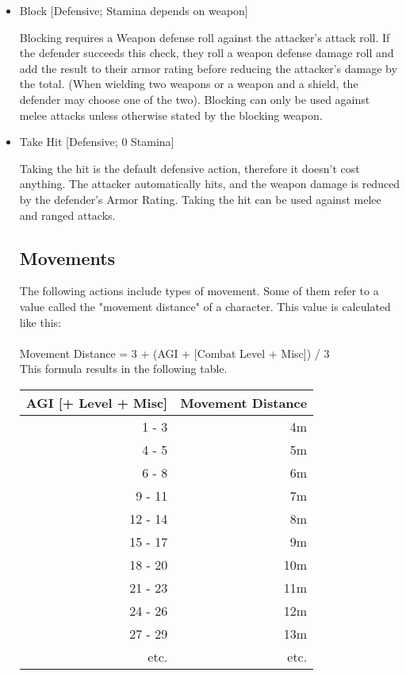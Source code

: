 \begin{itemize}
\item Block [Defensive; Stamina depends on weapon]

Blocking requires a Weapon defense roll against the attacker's attack roll.
If the defender succeeds this check, they roll a weapon defense damage roll and add the result to their armor rating before reducing the attacker's damage by the total.
(When wielding two weapons or a weapon and a shield, the defender may choose one of the two).
Blocking can only be used against melee attacks unless otherwise stated by the blocking weapon.

\item Take Hit [Defensive; 0 Stamina]

Taking the hit is the default defensive action, therefore it doesn't cost anything.
The attacker automatically hits, and the weapon damage is reduced by the defender's Armor Rating.
Taking the hit can be used against melee and ranged attacks.


\subsection{Movements}\label{subsec:combatMovements}
The following actions include types of movement.
Some of them refer to a value called the "movement distance" of a character.
This value is calculated like this:\\
\\
Movement Distance = 3 + (AGI + [Combat Level + Misc]) / 3
\\
This formula results in the following table.\\

\begin{tabular}{r r}
    AGI [+ Level + Misc] & Movement Distance\\ \hline
    1 - 3 & 4m \\
    4 - 5 & 5m \\
    6 - 8 & 6m \\
    9 - 11 & 7m \\
    12 - 14 & 8m \\
    15 - 17 & 9m \\
    18 - 20 & 10m \\
    21 - 23 & 11m \\
    24 - 26 & 12m \\
    27 - 29 & 13m \\
    etc. & etc. \\
\end{tabular}\\~\\


\end{itemize}

